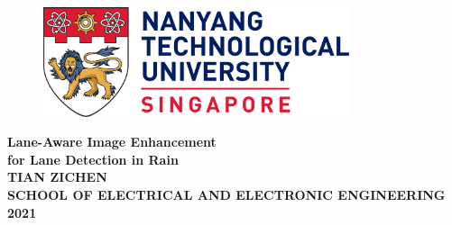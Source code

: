 \begin{titlepage}

\begin{figure}[h!]
\centering
\includegraphics[width=0.8\textwidth]{Title/NTU_logo.png}
\caption*{}
\label{fig:entropy} 
\end{figure}

\vspace{1in}

\centering
\Huge{\textbf{Lane-Aware Image Enhancement\\for Lane Detection in Rain}}\\[2in]

\LARGE{\textbf{TIAN ZICHEN}}\\[2in]

\Large
\textbf{SCHOOL OF ELECTRICAL AND ELECTRONIC ENGINEERING}\\[0.3in]


\textbf{2021}
\newpage
\end{titlepage}